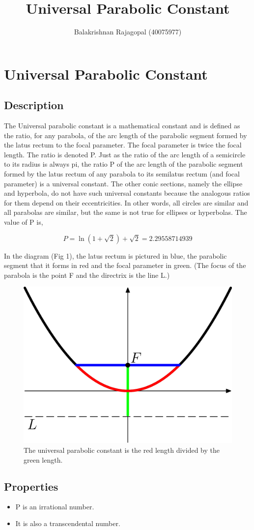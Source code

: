 \documentclass{report}
\title{Universal Parabolic Constant}
\author{Balakrishnan Rajagopal (40075977) }
\date{}
\begin{document}
\maketitle
\chapter{Universal Parabolic Constant}
\section{Description}
\onehalfspacing
The Universal parabolic constant is a mathematical constant and is defined as the ratio, for any parabola, of the arc length of the parabolic segment formed by the latus rectum to the focal parameter. The focal parameter is twice the focal length. The ratio is denoted P. Just as the ratio of the arc length of a semicircle to its radius is always pi, the ratio P of the arc length of the parabolic segment formed by the latus rectum of any parabola to its semilatus rectum (and focal parameter) is a universal constant. The other conic sections, namely the ellipse and hyperbola, do not have such universal constants because the analogous ratios for them depend on their eccentricities. In other words, all circles are similar and all parabolas are similar, but the same is not true for ellipses or hyperbolas.\newline
\newline The value of P is,

\begin{equation}
P = \ln(1+\sqrt{2})+\sqrt{2} = 2.29558714939
\end{equation}

\newline In the diagram (Fig 1), the latus rectum is pictured in blue, the parabolic segment that it forms in red
and the focal parameter in green. (The focus of the parabola is the point F and the directrix is the line L.)



\begin{figure}
\centering
    \includegraphics[width=.2\textwidth,center]{upc.png}
    \caption{The universal parabolic constant is the red length divided by the green length.}
\end{figure}

\section{Properties}
\onehalfspacing
\newline
\begin{itemize}
  \item P is an irrational number.
  \item It is also a transcendental number.
\end{itemize}









\end{document}
